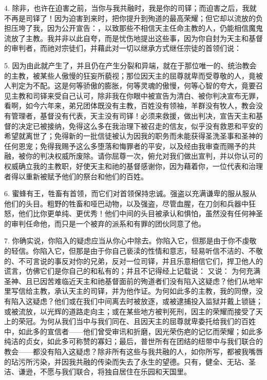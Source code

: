 4. 除非，也许在迫害之前，当你与我共融时，我是你的司铎；而迫害之后，我就不再是司铎了！因为迫害到来时，把你提升到殉道的最高荣耀；但它却以流放的负担压垮了我，因为公开宣告：，以致那些不相信天主任命主教的人，仍能相信魔鬼流放了主教。我并非以此自夸，而是忧伤地提出这些事，因为你自封为天主和基督的审判者，而祂对宗徒们，并藉此对一切以继承方式继任宗徒的首领们说：\par

5. 因为由此就产生了，并且仍在产生分裂和异端，就在于那位唯一的、统治教会的主教，被某些人傲慢的狂妄所藐视；那位因天主的屈尊就卑而受尊敬的人，竟被人判定为不配。这是何等骄傲的膨胀，何等灵魂的傲慢，何等心智的夸大，竟要召见主教和司铎来受自己认可，除非我在你眼中被宣告为清白、被你判决宣布无罪，看啊，如今六年来，弟兄团体既没有主教，百姓没有领袖，羊群没有牧人，教会没有管理者，基督没有代表，天主没有司铎！必须来救援，做出判决，宣告天主和基督的决定已被接纳，免得这么多在我治理下被召走的信友，似乎没有救恩和平安的希望就离世了；免得新的一批信徒被认为因我的职务而未能获得圣洗圣事和圣神的任何恩宠；免得我赐予这么多堕落和悔罪者的平安，以及经由我审查而赐予的共融，被你的判决权威所废除。请你屈尊一次，俯允对我们做出宣判，并以你认可的权威确立我的主教职，好使天主和祂的基督感谢你，因为藉着你，一位代表和治理者得以重新被赋予他们的祭台和他们的百姓。\par

6. 蜜蜂有王，牲畜有首领，而它们对首领保持忠诚。强盗以充满谦卑的服从服从他们的头目。粗野的牲畜和哑巴动物，以及强盗，尽管血腥，在刀剑和兵器中狂怒，他们比你更单纯、更优秀！他们中间的头目被承认和惧怕，虽然没有任何神圣的审判任命他，而只是一个被弃的派系和有罪的团伙同意了他。\par

7. 你确实说，你陷入的疑虑应当从你心中除去。你陷入它，但那是由于你不虔敬的轻信。你陷入它，但那是由于你自己亵渎的性情和意志，轻易听信不洁的、不敬的、不可言说的事反对你的兄弟，反对一位司铎，并且乐意相信它们，捍卫他人的谎言，仿佛它们是你自己的和私有的；并且不记得经上记载说： 又说： 为何充满圣神、且已因苦难临近天主和祂基督面前的殉道者们没有陷入这疑虑？他们从地牢里写信给主教，承认天主的司铎，并为他作证。为何如此多的主教，我的同僚，没有陷入这疑虑？他们或在我们中间离去时被放逐，或被逮捕投入监狱并戴上锁链；或被流放，以光辉的道路走向主；或在某些地方被判死刑，因主的荣耀而接受了天上的荣冠。为何从我们当中与我们同在、且因天主的屈尊就卑委托给我们的百姓中，如此多的宣信者——他们曾受审讯和折磨，因光荣伤疤的记忆而荣耀；如此多纯洁的贞女，如此多可称赞的寡妇；最后，普世所有在团结的纽带中与我们联合的教会——都没有陷入这疑虑？除非所有这些与我共融的人，如你所写，都被我嘴唇的玷污所污染，并因我共融的传染而失去了永生的望德。只有，健全、无玷、圣洁、谦逊，不愿与我们联合，将独自居住在乐园和天国里。\par

